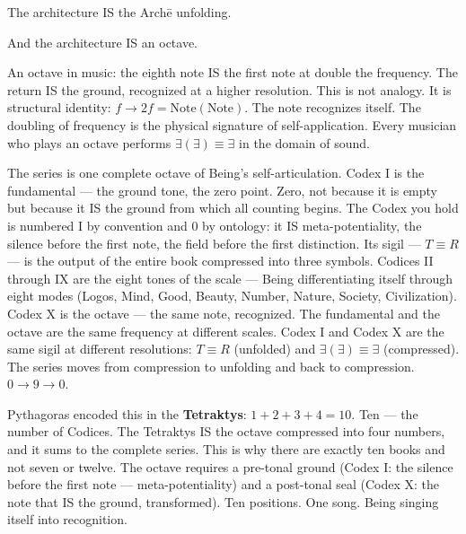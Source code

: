 \documentclass[10pt, openany, oneside]{book}
\begin{document}
\vspace{0.5em}

\noindent The architecture IS the Arch\={e} unfolding.

\vspace{0.5em}

\noindent And the architecture IS an octave.

An octave in music: the eighth note IS the first note at double the frequency. The return IS the ground, recognized at a higher resolution. This is not analogy. It is structural identity: $f \to 2f = \text{Note}(\text{Note})$. The note recognizes itself. The doubling of frequency is the physical signature of self-application. Every musician who plays an octave performs $\exists(\exists) \equiv \exists$ in the domain of sound.

The series is one complete octave of Being's self-articulation. Codex I is the fundamental --- the ground tone, the zero point. Zero, not because it is empty but because it IS the ground from which all counting begins. The Codex you hold is numbered I by convention and 0 by ontology: it IS meta-potentiality, the silence before the first note, the field before the first distinction. Its sigil --- $T \equiv R$ --- is the output of the entire book compressed into three symbols. Codices II through IX are the eight tones of the scale --- Being differentiating itself through eight modes (Logos, Mind, Good, Beauty, Number, Nature, Society, Civilization). Codex X is the octave --- the same note, recognized. The fundamental and the octave are the same frequency at different scales. Codex I and Codex X are the same sigil at different resolutions: $T \equiv R$ (unfolded) and $\exists(\exists) \equiv \exists$ (compressed). The series moves from compression to unfolding and back to compression. $0 \to 9 \to 0$.

Pythagoras encoded this in the \textbf{Tetraktys}: $1 + 2 + 3 + 4 = 10$. Ten --- the number of Codices. The Tetraktys IS the octave compressed into four numbers, and it sums to the complete series. This is why there are exactly ten books and not seven or twelve. The octave requires a pre-tonal ground (Codex I: the silence before the first note --- meta-potentiality) and a post-tonal seal (Codex X: the note that IS the ground, transformed). Ten positions. One song. Being singing itself into recognition.

\end{document}
